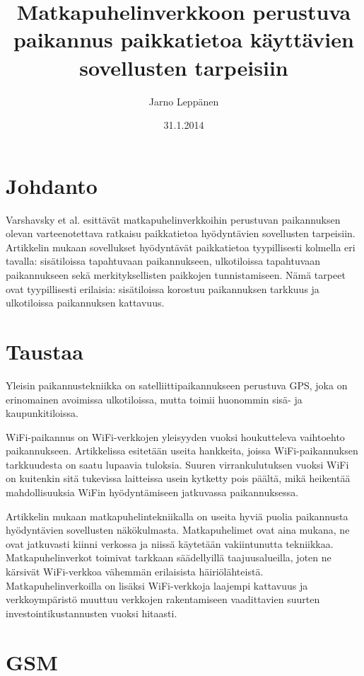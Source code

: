 \documentclass[a4paper]{scrartcl}
\author{Jarno Leppänen}
\title{Matkapuhelinverkkoon perustuva paikannus
paikkatietoa käyttävien sovellusten tarpeisiin}
\date{31.1.2014}
\begin{document}
\maketitle

\section{Johdanto}

Varshavsky et al.\cite{Varshavsky06aregsm} esittävät
matkapuhelinverkkoihin perustuvan paikannuksen olevan
varteenotettava ratkaisu paikkatietoa hyödyntävien
sovellusten tarpeisiin. Artikkelin mukaan sovellukset
hyödyntävät paikkatietoa tyypillisesti kolmella eri tavalla:
sisätiloissa tapahtuvaan paikannukseen, ulkotiloissa
tapahtuvaan paikannukseen sekä merkityksellisten paikkojen
tunnistamiseen. Nämä tarpeet ovat tyypillisesti erilaisia:
sisätiloissa korostuu paikannuksen tarkkuus ja ulkotiloissa
paikannuksen kattavuus.

\section{Taustaa}

Yleisin paikannustekniikka on satelliittipaikannukseen
perustuva GPS, joka on erinomainen avoimissa ulkotiloissa,
mutta toimii huonommin sisä- ja kaupunkitiloissa.

WiFi-paikannus on WiFi-verkkojen yleisyyden vuoksi
houkutteleva vaihtoehto paikannukseen.  Artikkelissa
esitetään useita hankkeita, joissa WiFi-paikannuksen
tarkkuudesta on saatu lupaavia tuloksia.  Suuren
virrankulutuksen vuoksi WiFi on kuitenkin sitä tukevissa
laitteissa usein kytketty pois päältä, mikä heikentää
mahdollisuuksia WiFin hyödyntämiseen jatkuvassa
paikannuksessa.

Artikkelin mukaan matkapuhelintekniikalla on useita hyviä
puolia paikannusta hyödyn\-tävien sovellusten näkökulmasta.
Matkapuhelimet ovat aina mukana, ne ovat jatkuvasti kiinni
verkossa ja niissä käytetään vakiintunutta tekniikkaa.
Matkapuhelinverkot toimivat tarkkaan säädellyillä
taajuusalueilla, joten ne kärsivät WiFi-verkkoa vähemmän
erilaisista häiriölähteistä.  Matkapuhelinverkoilla on
lisäksi WiFi-verkkoja laajempi kattavuus ja verkkoympäristö
muuttuu verkkojen rakentamiseen vaadittavien suurten
investointikustannusten vuoksi hitaasti.

\section{GSM}
\end{document}
